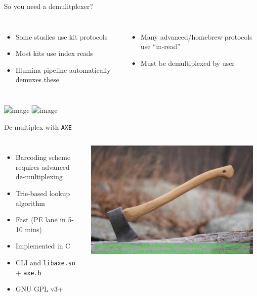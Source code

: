 \documentclass[t]{beamer}
\begin{document}
\begin{frame}{So you need a demulitplexer?}
  \begin{columns}[t]
    \begin{itemize}
      \item Some studies use kit protocols
      \item Most kits use index reads
      \item Illumina pipeline automatically demuxes these
    \end{itemize}
    \begin{itemize}
      \item<2> Many advanced/homebrew protocols use ``in-read''
      \item<2> Must be demultiplexed by user
    \end{itemize}
  \end{columns}
    \begin{center}
      \includegraphics<1|only@1>[width=0.8\textwidth]{img/2ndread_barcodes.png}
      \includegraphics<2>[width=0.8\textwidth]{img/simple_barcodes.png}
    \end{center}
\end{frame}

\begin{frame}{De-multiplex with \texttt{AXE}}
  \begin{columns}[t]
    \begin{itemize}
      \item Barcoding scheme requires advanced de-multiplexing
      \item Trie-based lookup algorithm
      \item Fast (PE lane in 5-10 mins)
      \item Implemented in C
      \item CLI and \texttt{libaxe.so} + \texttt{axe.h}
      \item GNU GPL v3+
    \end{itemize}
    \begin{center}
      \includegraphics[width=\textwidth]{img/axe.png}
    \end{center}
  \end{columns}
\end{frame}
\end{document}
